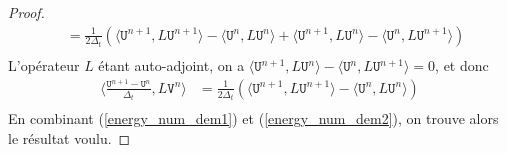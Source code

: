 \documentclass[12pt,a4paper]{article}
\numberwithin{equation}{section}
\begin{document}
\begin{proof}
\begin{align*}
        & = \frac{1}{2\Delta_t}\left(\langle \texttt{U}^{n+1}   ,L\texttt{U}^{n+1} \rangle - \langle \texttt{U}^{n}  ,L\texttt{U}^{n} \rangle + \langle \texttt{U}^{n+1} ,L\texttt{U}^{n} \rangle - \langle \texttt{U}^{n}  ,L\texttt{U}^{n+1} \rangle\right)\\
    \end{align*}
    L'opérateur $L$ étant auto-adjoint, on a $\langle \texttt{U}^{n+1} ,L\texttt{U}^{n} \rangle - \langle \texttt{U}^{n}  ,L\texttt{U}^{n+1} \rangle = 0$, et donc 
    \begin{equation}\label{energy_num_dem2}
        \begin{aligned}
            \langle \frac{\texttt{U}^{n+1}-\texttt{U}^{n}}{\Delta_t} , L\texttt{V}^n \rangle& = \frac{1}{2\Delta_t}\left(\langle \texttt{U}^{n+1}   ,L\texttt{U}^{n+1} \rangle - \langle \texttt{U}^{n}  ,L\texttt{U}^{n} \rangle\right)\\
        \end{aligned}
    \end{equation}
    En combinant (\ref{energy_num_dem1}) et (\ref{energy_num_dem2}), on trouve alors le résultat voulu.
    
    
\end{proof}
\end{document}
